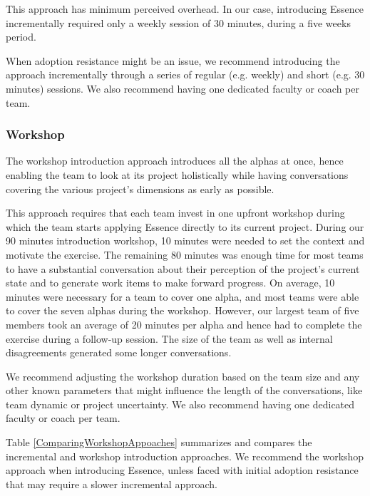 This approach has minimum perceived overhead. In our case, introducing Essence incrementally required only a weekly session of 30 minutes, during a five weeks period.

When adoption resistance might be an issue, we recommend introducing the approach incrementally through a series of regular (e.g. weekly) and short (e.g. 30 minutes) sessions. We also recommend having one dedicated faculty or coach per team.

\subsubsection{Workshop}
The workshop introduction approach introduces all the alphas at once, hence enabling the team to look at its project holistically while having conversations covering the various project's dimensions as early as possible.

This approach requires that each team invest in one upfront workshop during which the team starts applying Essence directly to its current project. During our 90 minutes introduction workshop, 10 minutes were needed to set the context and motivate the exercise. The remaining 80 minutes was enough time for most teams to have a substantial conversation about their perception of the project's current state and to generate work items to make forward progress. On average, 10 minutes were necessary for a team to cover one alpha, and most teams were able to cover the seven alphas during the workshop. However, our largest team of five members took an average of 20 minutes per alpha and hence had to complete the exercise during a follow-up session. The size of the team as well as internal disagreements generated some longer conversations.

We recommend adjusting the workshop duration based on the team size and any other known parameters that might influence the length of the conversations, like team dynamic or project uncertainty. We also recommend having one dedicated faculty or coach per team.

Table \ref{ComparingWorkshopAppoaches} summarizes and compares the incremental and workshop introduction approaches. We recommend the workshop approach when introducing Essence, unless faced with initial adoption resistance that may require a slower incremental approach.

